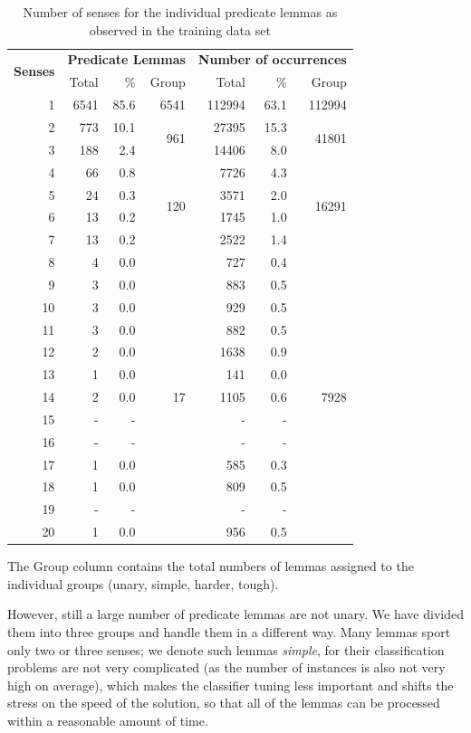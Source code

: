 \documentclass[12pt,notitlepage]{report}
\begin{document}
\begin{table}[htb]
\caption{Number of senses for the individual predicate lemmas as observed in the training data set}\label{tab:senses-num}\footnotesize
\begin{center}
\begin{tabular}{|r|rrr|rrr|}\hline
\multirow{2}{*}{\bf Senses} & \multicolumn{3}{|c|}{\bf Predicate Lemmas} & \multicolumn{3}{|c|}{\bf Number of occurrences} \\
 & Total & \% & Group & Total & \% & Group \\\hline
1 & 6541 & 85.6 & 6541 & 112994 & 63.1 & 112994 \\\hline
2 & 773 & 10.1  & \multirow{2}{*}{961} & 27395 & 15.3 & \multirow{2}{*}{41801} \\
3 & 188 & 2.4 & & 14406 & 8.0 & \\\hline
4 & 66 & 0.8 & \multirow{4}{*}{120} & 7726 & 4.3 & \multirow{4}{*}{16291} \\
5 & 24 & 0.3 & & 3571 & 2.0 & \\
6 & 13 & 0.2 & & 1745 & 1.0 & \\
7 & 13 & 0.2 & & 2522 & 1.4 & \\
8 & 4 & 0.0 & & 727 & 0.4 & \\\hline
9 & 3 & 0.0 & \multirow{11}{*}{17} & 883 & 0.5 & \multirow{11}{*}{7928} \\
10 & 3 & 0.0 & & 929 & 0.5 & \\
11 & 3 & 0.0 & & 882 & 0.5 & \\
12 & 2 & 0.0 & & 1638 & 0.9 & \\
13 & 1 & 0.0 & & 141 & 0.0 & \\
14 & 2 & 0.0 & & 1105 & 0.6 & \\
15 & - & - & & - & - & \\
16 & - & - & & - & - & \\
17 & 1 & 0.0 & & 585 & 0.3 & \\
18 & 1 & 0.0 & & 809 & 0.5 & \\
19 & - & - & & - & - & \\
20 & 1 & 0.0 & & 956 & 0.5 & \\\hline
\end{tabular}
\end{center}
The Group column contains the total numbers of lemmas assigned to the individual groups (unary, simple, harder, tough).
\end{table}

However, still a large number of predicate lemmas are not unary. We have divided them into three groups and handle them in a different way. Many lemmas sport only two or three senses; we denote such lemmas \emph{simple}, for their classification problems are not very complicated (as the number of instances is also not very high on average), which makes the classifier tuning less important and shifts the stress on the speed of the solution, so that all of the lemmas can be processed within a reasonable amount of time.
\end{document}
